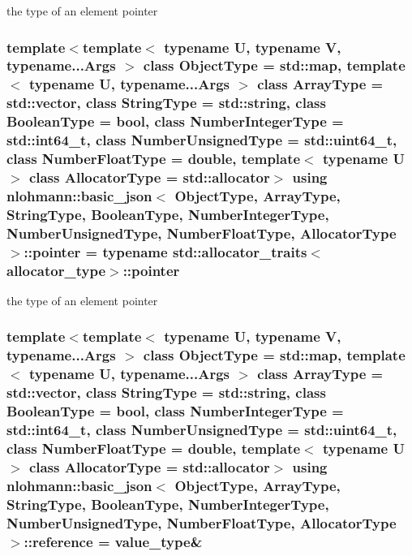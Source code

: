 the type of an element pointer 

\hypertarget{classnlohmann_1_1basic__json_a9d1b58099dc64695fcf2847ab0b2a7c7}{
\subsubsection[{pointer}]{\setlength{\rightskip}{0pt plus 5cm}template$<$template$<$ typename U, typename V, typename...\-Args $>$ class Object\-Type = std\-::map, template$<$ typename U, typename...\-Args $>$ class Array\-Type = std\-::vector, class String\-Type  = std\-::string, class Boolean\-Type  = bool, class Number\-Integer\-Type  = std\-::int64\-\_\-t, class Number\-Unsigned\-Type  = std\-::uint64\-\_\-t, class Number\-Float\-Type  = double, template$<$ typename U $>$ class Allocator\-Type = std\-::allocator$>$ using {\bf nlohmann\-::basic\-\_\-json}$<$ Object\-Type, Array\-Type, String\-Type, Boolean\-Type, Number\-Integer\-Type, Number\-Unsigned\-Type, Number\-Float\-Type, Allocator\-Type $>$\-::{\bf pointer} =  typename std\-::allocator\-\_\-traits$<${\bf allocator\-\_\-type}$>$\-::{\bf pointer}}}\label{classnlohmann_1_1basic__json_a9d1b58099dc64695fcf2847ab0b2a7c7}


the type of an element pointer 

\hypertarget{classnlohmann_1_1basic__json_a3ec8e17be8732fe436e9d6733f52b7a3}{
\subsubsection[{reference}]{\setlength{\rightskip}{0pt plus 5cm}template$<$template$<$ typename U, typename V, typename...\-Args $>$ class Object\-Type = std\-::map, template$<$ typename U, typename...\-Args $>$ class Array\-Type = std\-::vector, class String\-Type  = std\-::string, class Boolean\-Type  = bool, class Number\-Integer\-Type  = std\-::int64\-\_\-t, class Number\-Unsigned\-Type  = std\-::uint64\-\_\-t, class Number\-Float\-Type  = double, template$<$ typename U $>$ class Allocator\-Type = std\-::allocator$>$ using {\bf nlohmann\-::basic\-\_\-json}$<$ Object\-Type, Array\-Type, String\-Type, Boolean\-Type, Number\-Integer\-Type, Number\-Unsigned\-Type, Number\-Float\-Type, Allocator\-Type $>$\-::{\bf reference} =  {\bf value\-\_\-type}\&}}\label{classnlohmann_1_1basic__json_a3ec8e17be8732fe436e9d6733f52b7a3}


